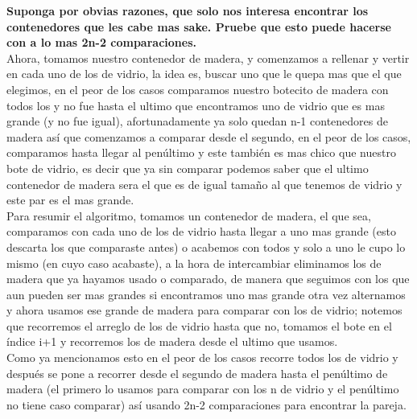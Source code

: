 \textbf{Suponga por obvias razones, que solo nos interesa encontrar los contenedores que les cabe mas sake. Pruebe que esto puede hacerse con a lo mas 2n-2 comparaciones.}\\

Ahora, tomamos nuestro contenedor de madera, y comenzamos a rellenar y vertir en cada uno de los de vidrio, la idea es, buscar uno que le quepa mas que el que elegimos, en el peor de los casos comparamos nuestro botecito de madera con todos los y no fue hasta el ultimo que encontramos uno de vidrio que es mas grande (y no fue igual), afortunadamente ya solo quedan n-1 contenedores de madera así que comenzamos a comparar desde el segundo, en el peor de los casos, comparamos hasta llegar al penúltimo y este también es mas chico que nuestro bote de vidrio, es decir que ya sin comparar podemos saber que el ultimo contenedor de madera sera el que es de igual tamaño al que tenemos de vidrio y este par es el mas grande.\\

Para resumir el algoritmo, tomamos un contenedor de madera, el que sea, comparamos con cada uno de los de vidrio hasta llegar a uno mas grande (esto descarta los que comparaste antes) o acabemos con todos y solo a uno le cupo lo mismo (en cuyo caso acabaste), a la hora de intercambiar eliminamos los de madera que ya hayamos usado o comparado, de manera que seguimos con los que aun pueden ser mas grandes si encontramos uno mas grande otra vez alternamos y ahora usamos ese grande de madera para comparar con los de vidrio; notemos que recorremos el arreglo de los de vidrio hasta que no, tomamos el bote en el índice i+1 y recorremos los de madera 
desde el ultimo que usamos.\\

Como ya mencionamos esto en el peor de los casos recorre todos los de vidrio y después se pone a recorrer desde el segundo de madera hasta el penúltimo de madera (el primero lo usamos para comparar con los n de vidrio y el penúltimo no tiene caso comparar) así usando 2n-2 comparaciones para encontrar la pareja.\\